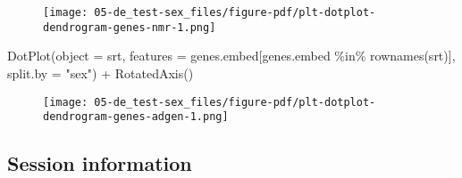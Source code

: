 \documentclass[
  letterpaper,
  DIV=11,
  numbers=noendperiod]{scrartcl}
\newenvironment{Shaded}{\begin{snugshade}}{\end{snugshade}}
\newcommand{\AttributeTok}[1]{\textcolor[rgb]{0.40,0.45,0.13}{#1}}
\newcommand{\ConstantTok}[1]{\textcolor[rgb]{0.56,0.35,0.01}{#1}}
\newcommand{\FunctionTok}[1]{\textcolor[rgb]{0.28,0.35,0.67}{#1}}
\newcommand{\NormalTok}[1]{\textcolor[rgb]{0.00,0.23,0.31}{#1}}
\newcommand{\OtherTok}[1]{\textcolor[rgb]{0.00,0.23,0.31}{#1}}
\newcommand{\SpecialCharTok}[1]{\textcolor[rgb]{0.37,0.37,0.37}{#1}}
\newcommand{\StringTok}[1]{\textcolor[rgb]{0.13,0.47,0.30}{#1}}
\begin{document}
\begin{figure}[H]

{\centering \texttt{[image: 05-de\_test-sex\_files/figure-pdf/plt-dotplot-dendrogram-genes-nmr-1.png]}

}

\end{figure}

\begin{Shaded}
\begin{Highlighting}[]
\FunctionTok{DotPlot}\NormalTok{(}\AttributeTok{object =}\NormalTok{ srt, }\AttributeTok{features =}\NormalTok{ genes.embed[genes.embed }\SpecialCharTok{\%in\%} \FunctionTok{rownames}\NormalTok{(srt)], }\AttributeTok{split.by =} \StringTok{"sex"}\NormalTok{) }\SpecialCharTok{+} \FunctionTok{RotatedAxis}\NormalTok{()}
\end{Highlighting}
\end{Shaded}

\begin{figure}[H]

{\centering \texttt{[image: 05-de\_test-sex\_files/figure-pdf/plt-dotplot-dendrogram-genes-adgen-1.png]}

}

\end{figure}

\hypertarget{session-information}{%
\subsection{Session information}\label{session-information}}

\begin{Shaded}
\end{Shaded}
\end{document}
